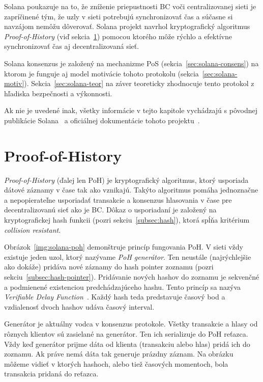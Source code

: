 Solana poukazuje na to, že zníženie priepustnosti BC voči centralizovanej sieti je zapríčinené tým, že uzly v sieti potrebujú synchronizovať čas a súčasne si navzájom nemôžu dôverovať. Solana projekt navrhol kryptografický algoritmus \textit{Proof-of-History} (viď sekcia~\ref{sec:solana-poh}) pomocou ktorého môže rýchlo a efektívne synchronizovať čas aj decentralizovaná sieť.

Solana konsenzus je založený na mechanizme PoS (sekcia~\ref{sec:solana-consens}) na ktorom je funguje aj model motivácie tohoto protokolu (sekcia~\ref{sec:solana-motiv}). Sekcia~\ref{sec:solana-teor} na záver teoreticky zhodnocuje tento protokol z hľadiska bezpečnosti a výkonnosti.

Ak nie je uvedené inak, všetky informácie v tejto kapitole vychádzajú s pôvodnej publikácie Solana~\cite{solanaWp} a oficiálnej dokumentácie tohoto projektu~\cite{solanaDoc}.

\section{Proof-of-History}\label{sec:solana-poh}

\textit{Proof-of-History} (ďalej len PoH) je kryptografický algoritmus, ktorý usporiada dátové záznamy v čase tak ako vznikajú. Takýto algoritmus pomáha jednoznačne a nepopierateľne usporiadať transakcie a konsenzus hlasovania v čase pre decentralizovanú sieť ako je BC. Dôkaz o usporiadaní je založený na kryptografickej hash funkcii (pozri sekciu~\ref{subsec:hash}), ktorá spĺňa kritérium \textit{collision resistant}.

Obrázok~\ref{img:solana-poh} demonštruje princíp fungovania PoH. V sieti vždy existuje jeden uzol, ktorý nazývame \textit{PoH generátor}. Ten neustále (najrýchlejšie ako dokáže) pridáva nové záznamy do hash pointer zoznamu (pozri sekciu~\ref{subsec:hash-pointer}). Pridávanie nových hashov do zoznamu je sekvenčné a podmienené existenciou predchádzajúceho hashu. Tento princíp sa nazýva \textit{Verifiable Delay Function~\cite{vdfBoneh}}. Každý hash teda predstavuje časový bod a vzdialenosť dvoch hashov udáva časový interval.

Generátor je aktuálny vodca v konsenzus protokole. Všetky transakcie a hlasy od rôznych klientov sú zasielané na generátor. Ten ich serializuje do PoH reťazca. Vždy keď generátor prijme dáta od klienta (transakciu alebo hlas) pridá ich do zoznamu. Ak práve nemá dáta tak generuje prázdny záznam. Na obrázku môžeme vidieť v ktorých hashoch, alebo tiež časových momentoch, bola transakcia pridaná do reťazca.

